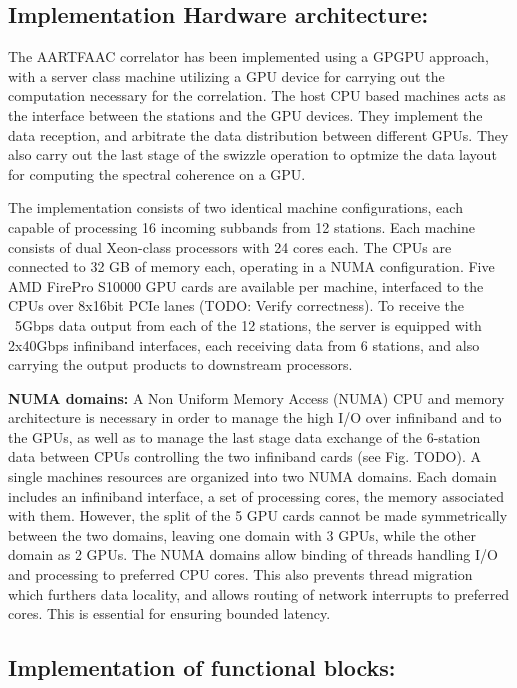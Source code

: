 \documentclass{ws-jai}
\begin{document}
\subsection  {Implementation  Hardware  architecture:} 
The AARTFAAC  correlator has  been implemented  using a  GPGPU approach,  with a
server class  machine utilizing a  GPU device  for carrying out  the computation
necessary  for  the correlation.   The  host  CPU  based  machines acts  as  the
interface between  the stations  and the  GPU devices.  They implement  the data
reception, and arbitrate the data distribution between different GPUs. They also
carry out the last stage of the swizzle operation to optmize the data layout for
computing the spectral coherence on a GPU.

The  implementation  consists  of  two identical  machine  configurations,  each
capable  of processing  16  incoming  subbands from  12  stations. Each  machine
consists  of  dual Xeon-class  processors  with  24  cores  each. The  CPUs  are
connected to 32 GB  of memory each, operating in a  NUMA configuration. Five AMD
FirePro S10000 GPU cards are available  per machine, interfaced to the CPUs over
8x16bit PCIe lanes (TODO: Verify correctness). To receive the ~5Gbps data output
from each  of the 12 stations,  the server is equipped  with 2x40Gbps infiniband
interfaces, each  receiving data from 6  stations, and also carrying  the output
products to downstream processors.

\textbf  {NUMA domains:}  A  Non Uniform  Memory Access  (NUMA)  CPU and  memory
architecture is necessary in order to manage the high I/O over infiniband and to
the GPUs,  as well as to  manage the last  stage data exchange of  the 6-station
data  between CPUs  controlling the  two infiniband  cards (see  Fig. TODO).   A
single  machines resources  are organized  into two  NUMA domains.   Each domain
includes  an  infiniband  interface,  a  set of  processing  cores,  the  memory
associated with  them. However,  the split  of the  5 GPU  cards cannot  be made
symmetrically between the two domains, leaving one domain with 3 GPUs, while the
other domain as 2 GPUs.  The NUMA  domains allow binding of threads handling I/O
and  processing to  preferred CPU  cores.  This  also prevents  thread migration
which  furthers data  locality,  and  allows routing  of  network interrupts  to
preferred cores. This is essential for ensuring bounded latency.

\subsection {Implementation of functional  blocks:} 
\end{document}
